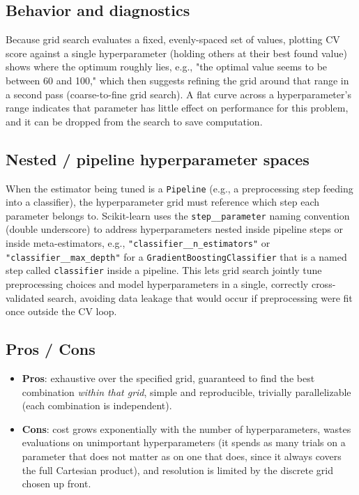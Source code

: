\documentclass[conference]{IEEEtran}
\begin{document}
\subsection*{Behavior and diagnostics}
Because grid search evaluates a fixed, evenly-spaced set of values, plotting CV score against a single hyperparameter (holding others at their best found value) shows where the optimum roughly lies, e.g., "the optimal value seems to be between 60 and 100," which then suggests refining the grid around that range in a second pass (coarse-to-fine grid search). A flat curve across a hyperparameter's range indicates that parameter has little effect on performance for this problem, and it can be dropped from the search to save computation.

\subsection*{Nested / pipeline hyperparameter spaces}
When the estimator being tuned is a \texttt{Pipeline} (e.g., a preprocessing step feeding into a classifier), the hyperparameter grid must reference which step each parameter belongs to. Scikit-learn uses the \texttt{step\_\_parameter} naming convention (double underscore) to address hyperparameters nested inside pipeline steps or inside meta-estimators, e.g., \texttt{"classifier\_\_n\_estimators"} or \texttt{"classifier\_\_max\_depth"} for a \texttt{GradientBoostingClassifier} that is a named step called \texttt{classifier} inside a pipeline. This lets grid search jointly tune preprocessing choices and model hyperparameters in a single, correctly cross-validated search, avoiding data leakage that would occur if preprocessing were fit once outside the CV loop.

\subsection*{Pros / Cons}
\begin{itemize}
    \item \textbf{Pros}: exhaustive over the specified grid, guaranteed to find the best combination \textit{within that grid}, simple and reproducible, trivially parallelizable (each combination is independent).
    \item \textbf{Cons}: cost grows exponentially with the number of hyperparameters, wastes evaluations on unimportant hyperparameters (it spends as many trials on a parameter that does not matter as on one that does, since it always covers the full Cartesian product), and resolution is limited by the discrete grid chosen up front.
\end{itemize}
\end{document}
